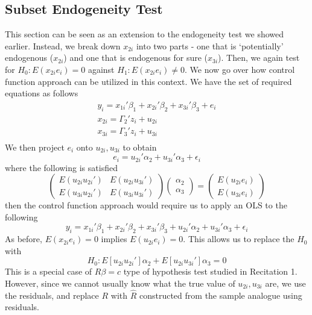 \documentclass[12pt]{article}
\theoremstyle{definition}
\theoremstyle{property}
\theoremstyle{assumption}
\theoremstyle{example}
\theoremstyle{comment}
\begin{document}
\subsection{Subset Endogeneity Test}
This section can be seen as an extension to the endogeneity test we showed earlier. Instead, we break down $x_{2i}$ into two parts - one that is `potentially' endogenous ($x_{2i}$) and one that is endogenous for sure ($x_{3i}$). Then, we again test for  $H_0: E(x_{2i}e_i)=0$ against $H_1:E(x_{2i}e_i)\neq0$. We now go over how control function approach can be utilized in this context. We have the set of required equations as follows
\begin{gather*}
y_i = x_{1i}'\beta_1 + x_{2i}'\beta_2+x_{3i}'\beta_3+e_i \tag{Structural}\\
x_{2i}=\Gamma_{2}'z_{i}+u_{2i} \tag{Reduced Form 2}\\
x_{3i}=\Gamma_{3}'z_{i}+u_{3i} \tag{Reduced Form 3}\\
\end{gather*}
We then project $e_i$ onto $u_{2i}, u_{3i}$ to obtain
\[
e_i = u_{2i}'\alpha_2 + u_{3i}'\alpha_3 + \epsilon_i \tag{LP2}
\]
where the following is satisfied
\[
\begin{pmatrix}E(u_{2i}u_{2i}') & E(u_{2i}u_{3i}')\\E(u_{3i}u_{2i}') & E(u_{3i}u_{3i}')\end{pmatrix}\begin{pmatrix} \alpha_2 \\ \alpha_3\end{pmatrix} = \begin{pmatrix} E(u_{2i}e_i) \\ E(u_{3i}e_i)\end{pmatrix}
\]
then the control function approach would require us to apply an OLS to the following
\[
y_i = x_{1i}'\beta_1 + x_{2i}'\beta_2+x_{3i}'\beta_3+ u_{2i}'\alpha_2 + u_{3i}'\alpha_3 + \epsilon_i \tag{CFA2}
\]
As before, $E(x_{2i}e_i)=0$ implies $E(u_{2i}e_i)=0$. This allows us to replace the $H_0$ with
\[
H_0: E[u_{2i}u_{2i}']\alpha_2+E[u_{2i}u_{3i}']\alpha_3=0
\]
This is a special case of $R\beta=c$ type of hypothesis test studied in Recitation 1. However, since we cannot usually know what the true value of $u_{2i}, u_{3i}$ are, we use the residuals, and replace $R$ with $\widehat{R}$ constructed from the sample analogue using residuals. 
\end{document}
